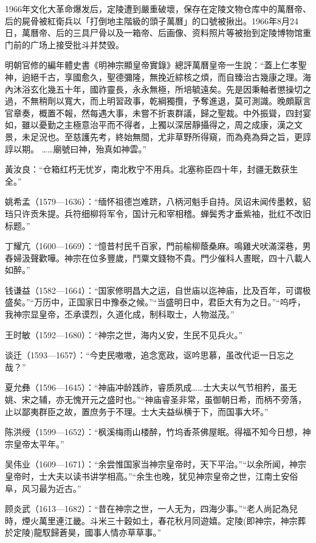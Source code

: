 1966年文化大革命爆发后，定陵遭到嚴重破壞，保存在定陵文物仓库中的萬曆帝、后的屍骨被紅衛兵以「打倒地主階級的頭子萬曆」的口號被揪出。1966年8月24日，萬曆帝、后的三具尸骨以及一箱帝、后画像、资料照片等被抬到定陵博物馆重门前的广场上接受批斗并焚毁。

明朝官修的編年體史書《明神宗顯皇帝實錄》總評萬曆皇帝一生說：“蓋上仁孝聖神，逈絕千古，享國愈久，聖德彌隆，無挽近綜核之煩，而自臻治古幾康之理。海內沐浴玄化幾五十年，國祚靈長，永永無極，所培毓遠矣。先是因秉軸者懲操切之過，不無稍劑以寬大，而上明習政事，乾綱獨攬，予奪進退，莫可測識。晚頗厭言官章奏，概置不報，然每遇大事，未嘗不折衷群議，歸之聖裁。中外振聳，四封宴如，雖以憂勤之主極意治平而不得者，上獨以深居靜攝得之，周之成康，漢之文景，未足況也。至慈護先考，終始無間，尤非草野所得窺，而為堯為舜之旨，更諄諄以期。 ……廟號曰神，殆真如神雲。”

黃汝良：“仓箱红朽无忧岁，南北敉宁不用兵。北塞称臣四十年，封疆无数获生全。”

姚希孟（1579—1636）：“缅怀祖德岂难跻，八柄河魁手自持。凤诏未闻传墨敕，貂珰只许贡朱提。兵符细柳将军令，国计元和宰相稽。蝉鬓秀才垂紫袖，批红不改旧标题。”

丁耀亢（1600—1669）：“憶昔村民千百家，門前榆柳蔭桑麻。鳴雞犬吠滿深巷，男舂婦汲聲歡嘩。神宗在位多豐歲，鬥粟文錢物不貴。門少催科人晝眠，四十八載人如醉。”

钱谦益（1582—1664）：“国家修明昌大之运，自世庙以迄神庙，比及百年，可谓极盛矣。”“万历中，正国家日中豫泰之候。”“当盛明日中，君臣大有为之日。”“呜呼，我神宗显皇帝，丕承谟烈，久道化成，制科取士，人物滋茂。”

王时敏（1592—1680）：“神宗之世，海内乂安，生民不见兵火。”

谈迁（1593—1657）：“今吏民嗷嗷，追念宽政，讴吟思慕，虽改代讵一日忘之哉？”

夏允彝（1596—1645）：“神庙冲龄践祚，睿质夙成……士大夫以气节相矜，虽无姚、宋之辅，亦无愧开元之盛时也。”“神庙睿圣非常，虽御朝日希，而柄不旁落，止以鄙夷群臣之故，置庶务于不理。士大夫益纵横于下，而国事大坏。”

陈洪绶（1599—1652）：“枫溪梅雨山楼醉，竹坞香茶佛屋眠。得福不知今日想，神宗皇帝太平年。”

吴伟业（1609—1671）：“余尝惟国家当神宗皇帝时，天下平治。”“以余所闻，神宗皇帝时，士大夫以读书讲学相高。”“余生也晚，犹见神宗皇帝之世，江南土安俗阜，风习最为近古。”

顾炎武（1613—1682）：“昔在神宗之世，一人无为，四海少事。”“老人尚記為兒時，煙火萬里連江畿。斗米三十穀如土，春花秋月同遊嬉。定陵(即神宗，神宗葬於定陵)龍馭歸蒼昊，國事人情亦草草事。”

